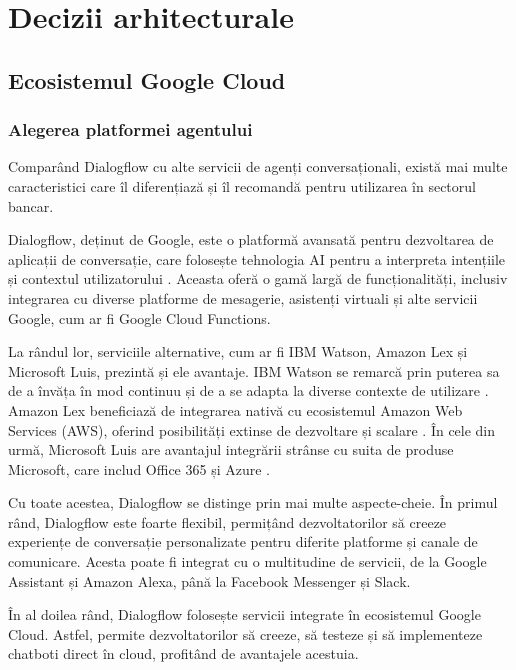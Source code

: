 \chapter{Decizii arhitecturale}

\section{Ecosistemul Google Cloud}

\subsection{Alegerea platformei agentului}

Comparând Dialogflow cu alte servicii de agenți conversaționali, există mai multe caracteristici care îl diferențiază și îl recomandă pentru utilizarea în sectorul bancar.

Dialogflow, deținut de Google, este o platformă avansată pentru dezvoltarea de aplicații de conversație, care folosește tehnologia AI pentru a interpreta intențiile și contextul utilizatorului \cite{google_dialogflow}. Aceasta oferă o gamă largă de funcționalități, inclusiv integrarea cu diverse platforme de mesagerie, asistenți virtuali și alte servicii Google, cum ar fi Google Cloud Functions.

La rândul lor, serviciile alternative, cum ar fi IBM Watson, Amazon Lex și Microsoft Luis, prezintă și ele avantaje. IBM Watson se remarcă prin puterea sa de a învăța în mod continuu și de a se adapta la diverse contexte de utilizare \cite{ibm_watson}. Amazon Lex beneficiază de integrarea nativă cu ecosistemul Amazon Web Services (AWS), oferind posibilități extinse de dezvoltare și scalare \cite{amazon_lex}. În cele din urmă, Microsoft Luis are avantajul integrării strânse cu suita de produse Microsoft, care includ Office 365 și Azure \cite{microsoft_luis}.

Cu toate acestea, Dialogflow se distinge prin mai multe aspecte-cheie. În primul rând, Dialogflow este foarte flexibil, permițând dezvoltatorilor să creeze experiențe de conversație personalizate pentru diferite platforme și canale de comunicare. Acesta poate fi integrat cu o multitudine de servicii, de la Google Assistant și Amazon Alexa, până la Facebook Messenger și Slack.

În al doilea rând, Dialogflow folosește servicii integrate în ecosistemul Google Cloud. Astfel, permite dezvoltatorilor să creeze, să testeze și să implementeze chatboti direct în cloud, profitând de avantajele acestuia.

